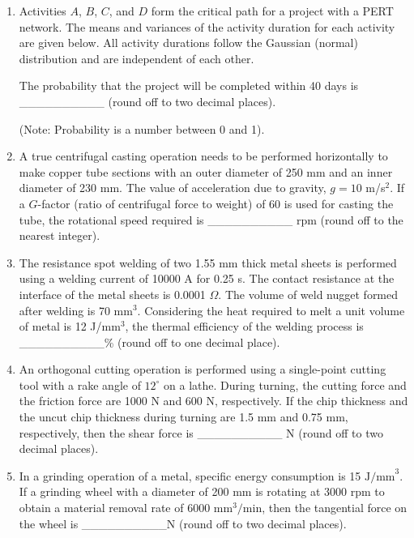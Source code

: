 \documentclass[journal,12pt,onecolumn]{IEEEtran}
\theoremstyle{remark}
\begin{document}
\begin{enumerate}
\item Activities $A$, $B$, $C$, and $D$ form the critical path for a project with a PERT network. The means and variances of the activity duration for each activity are given below. All activity durations follow the Gaussian (normal) distribution and are independent of each other.

\begin{table}[ht!]
	\centering
	\resizebox{0.5\textwidth}{!}{
		
	}
\end{table}

The probability that the project will be completed within 40 days is \_\_\_\_\_\_\_\_\_\_ (round off to two decimal places).

(Note: Probability is a number between 0 and 1).\\

\item A true centrifugal casting operation needs to be performed horizontally to make copper tube sections with an outer diameter of 250 mm and an inner diameter of 230 mm. The value of acceleration due to gravity, $g = 10$ m/s$^2$. If a $G$-factor (ratio of centrifugal force to weight) of 60 is used for casting the tube, the rotational speed required is \_\_\_\_\_\_\_\_\_\_ rpm (round off to the nearest integer).\\

\item The resistance spot welding of two 1.55 mm thick metal sheets is performed using a welding current of 10000 A for 0.25 s. The contact resistance at the interface of the metal sheets is 0.0001 $\Omega$. The volume of weld nugget formed after welding is 70 mm$^3$. Considering the heat required to melt a unit volume of metal is 12 J/mm$^3$, the thermal efficiency of the welding process is \_\_\_\_\_\_\_\_\_\_\% (round off to one decimal place). \\

\item An orthogonal cutting operation is performed using a single-point cutting tool with a rake angle of $12^\circ$ on a lathe. During turning, the cutting force and the friction force are 1000 N and 600 N, respectively. If the chip thickness and the uncut chip thickness during turning are 1.5 mm and 0.75 mm, respectively, then the shear force is \_\_\_\_\_\_\_\_\_\_ N (round off to two decimal places).\\

\item In a grinding operation of a metal, specific energy consumption is 15 $ \text{J/mm}^3 $. If a grinding wheel with a diameter of 200 mm is rotating at 3000 rpm to obtain a material removal rate of 6000 $ \text{mm}^3/\text{min} $, then the tangential force on the wheel is \_\_\_\_\_\_\_\_\_\_N (round off to two decimal places).\\


\end{enumerate}
\end{document}
